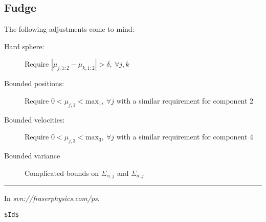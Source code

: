 \documentclass[12pt]{article}
\begin{document}
\subsection{Fudge}
\label{sec:fudge}

The following adjustments come to mind:
\begin{description}
\item[Hard sphere:] Require $\left|\mu_{j,1:2} - \mu_{k,1:2} \right| >
  \delta,~\forall j,k$
\item[Bounded positions:] Require $0 < \mu_{j,1} <
  \text{max}_1,~\forall j$ with a similar requirement for component 2
\item[Bounded velocities:] Require $0 < \mu_{j,3} <
  \text{max}_3,~\forall j$ with a similar requirement for component 4
\item[Bounded variance] Complicated bounds on $\Sigma_{\alpha,j}$ and
  $\Sigma_{a,j}$
\end{description}

\vfill \hrule
In \emph{svn://fraserphysics.com/ps}.
\begin{verbatim}
$Id$
\end{verbatim}
\end{document}
